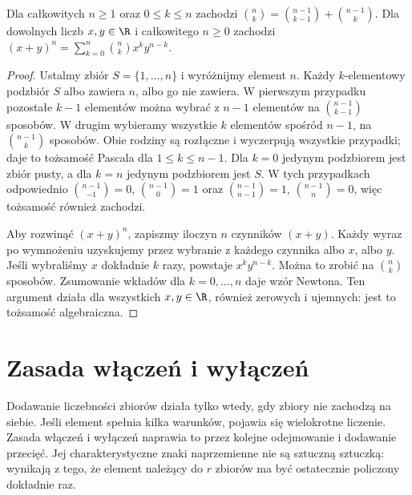 \begin{stwierdzenie}
Dla całkowitych $n\geq1$ oraz $0\leq k\leq n$ zachodzi
$\binom nk=\binom{n-1}{k-1}+\binom{n-1}k$. Dla dowolnych liczb
$x,y\in\R$ i całkowitego $n\geq0$ zachodzi
$(x+y)^n=\sum_{k=0}^n\binom nk x^k y^{n-k}$.
\end{stwierdzenie}
\begin{proof}
Ustalmy zbiór $S=\{1,\ldots,n\}$ i wyróżnijmy element
$n$. Każdy $k$-elementowy podzbiór $S$ albo zawiera $n$,
albo go nie zawiera. W pierwszym przypadku pozostałe
$k-1$ elementów można wybrać z $n-1$ elementów na
$\binom{n-1}{k-1}$ sposobów. W drugim wybieramy wszystkie
$k$ elementów spośród $n-1$, na $\binom{n-1}{k}$
sposobów. Obie rodziny są rozłączne i wyczerpują wszystkie
przypadki; daje to tożsamość Pascala dla $1\leq k\leq n-1$.
Dla $k=0$ jedynym podzbiorem jest zbiór pusty, a dla $k=n$
jedynym podzbiorem jest $S$. W tych przypadkach odpowiednio
$\binom{n-1}{-1}=0$, $\binom{n-1}{0}=1$ oraz
$\binom{n-1}{n-1}=1$, $\binom{n-1}{n}=0$, więc tożsamość
również zachodzi.

Aby rozwinąć $(x+y)^n$, zapiszmy iloczyn $n$ czynników
$(x+y)$. Każdy wyraz po wymnożeniu uzyskujemy przez
wybranie z każdego czynnika albo $x$, albo $y$.
Jeśli wybraliśmy $x$ dokładnie $k$ razy, powstaje
$x^ky^{n-k}$. Można to zrobić na $\binom nk$ sposobów.
Zsumowanie wkładów dla $k=0,\ldots,n$ daje wzór Newtona.
Ten argument działa dla wszystkich $x,y\in\R$, również
zerowych i ujemnych: jest to tożsamość algebraiczna.
\end{proof}

\section{Zasada włączeń i wyłączeń}
Dodawanie liczebności zbiorów działa tylko wtedy, gdy zbiory
nie zachodzą na siebie. Jeśli element spełnia kilka warunków,
pojawia się wielokrotne liczenie. Zasada włączeń i wyłączeń
naprawia to przez kolejne odejmowanie i dodawanie przecięć.
Jej charakterystyczne znaki naprzemienne nie są sztuczną sztuczką:
wynikają z tego, że element należący do $r$ zbiorów ma być
ostatecznie policzony dokładnie raz.

